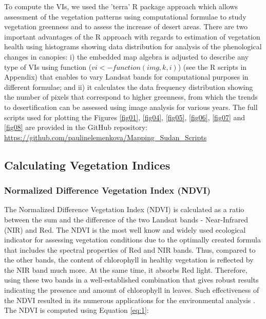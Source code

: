 \documentclass[jimaging,article,submit,pdftex,moreauthors]{Definitions/mdpi}
\begin{document}
To compute the VIs, we used the 'terra' R package approach which allows assessment of the vegetation patterns using computational formulae to study vegetation greenness and to assess the increase of desert areas. There are two important advantages of the R approach with regards to estimation of vegetation health using histograms showing data distribution for analysis of the phenological changes in canopies: i) the embedded map algebra is adjusted to describe any type of VIs using function ($vi <- function(img, k, i)$) (see the R scripts in Appendix) that enables to vary Landsat bands for computational purposes in different formulae; and ii) it calculates the data frequency distribution showing the number of pixels that correspond to higher greenness, from which the trends to desertification can be assessed using image analysis for various years. The full scripts used for plotting the Figures \ref{fig01}, \ref{fig04}, \ref{fig05}, \ref{fig06}, \ref{fig07} and \ref{fig08} are provided in the GitHub repository: \href{https://github.com/paulinelemenkova/Mapping_Sudan_Scripts}{https://github.com/paulinelemenkova/Mapping\_Sudan\_Scripts}

\subsection{Calculating Vegetation Indices}

\subsubsection{Normalized Difference Vegetation Index (NDVI)}
The Normalized Difference Vegetation Index (NDVI) \cite{Rouse} is calculated as a ratio between the sum and the difference of the two Landsat bands - Near-Infrared (NIR) and Red. The NDVI is the most well know and widely used ecological indicator for assessing vegetation conditions due to the optimally created formula that includes the spectral properties of Red and NIR bands. Thus, compared to the other bands, the content of chlorophyll in healthy vegetation is reflected by the NIR band much more. At the same time, it absorbs Red light. Therefore, using these two bands in a well-established combination that gives robust results indicating the presence and amount of chlorophyll in leaves. Such effectiveness of the NDVI resulted in its numerous applications for the environmental analysis \cite{w13192707,rs12244119,GHEBREZGABHER2020249,RULINDA2012169}. The NDVI is computed using Equation \ref{eq:1}:
\end{document}
